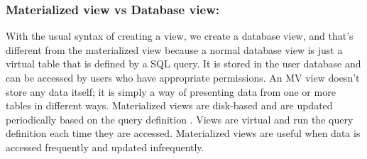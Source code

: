 \subsubsection{Materialized view vs Database view:} With the usual syntax of creating a view, we create a database view, and that's different from the materialized view because a normal database view is just a virtual table that is defined by a SQL query. It is stored in the user database and can be accessed by users who have appropriate permissions. An MV view doesn't store any data itself; it is simply a way of presenting data from one or more tables in different ways. Materialized views are disk-based and are updated periodically based on the query definition \cite{Stackoverflow-author-08-2008}. Views are virtual and run the query definition each time they are accessed. Materialized views are useful when data is accessed frequently and updated infrequently.